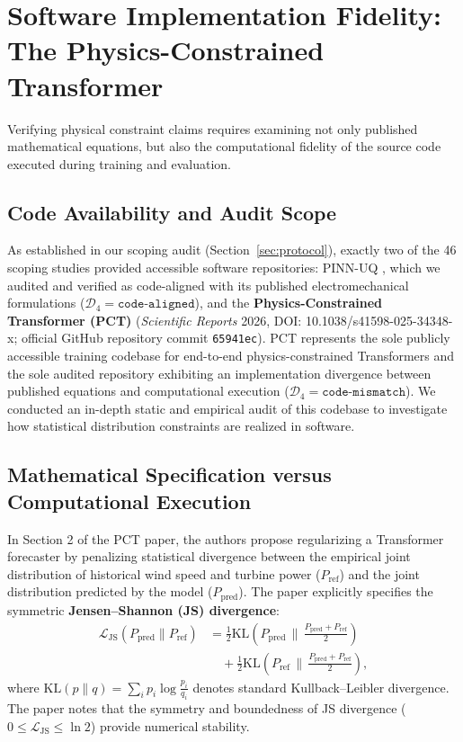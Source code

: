 \section{Software Implementation Fidelity: The Physics-Constrained Transformer}
\label{sec:code_audit}

Verifying physical constraint claims requires examining not only published mathematical equations, but also the computational fidelity of the source code executed during training and evaluation.

\subsection{Code Availability and Audit Scope}
As established in our scoping audit (Section~\ref{sec:protocol}), exactly two of the 46 scoping studies provided accessible software repositories: PINN-UQ \cite{s10_pinnuq2025}, which we audited and verified as code-aligned with its published electromechanical formulations ($\mathcal{D}_4 = \texttt{code-aligned}$), and the \textbf{Physics-Constrained Transformer (PCT)} \cite{pct2026} (\textit{Scientific Reports} 2026, DOI: 10.1038/s41598-025-34348-x; official GitHub repository commit \texttt{65941ec}). PCT represents the sole publicly accessible training codebase for end-to-end physics-constrained Transformers and the sole audited repository exhibiting an implementation divergence between published equations and computational execution ($\mathcal{D}_4 = \texttt{code-mismatch}$). We conducted an in-depth static and empirical audit of this codebase to investigate how statistical distribution constraints are realized in software.

\subsection{Mathematical Specification versus Computational Execution}
In Section 2 of the PCT paper, the authors propose regularizing a Transformer forecaster by penalizing statistical divergence between the empirical joint distribution of historical wind speed and turbine power ($P_{\text{ref}}$) and the joint distribution predicted by the model ($P_{\text{pred}}$). The paper explicitly specifies the symmetric \textbf{Jensen--Shannon (JS) divergence}:
\begin{equation}
\begin{aligned}
\mathcal{L}_{\text{JS}}(P_{\text{pred}} \parallel P_{\text{ref}}) &= \frac{1}{2} \text{KL}\left(P_{\text{pred}} \,\Big\|\, \frac{P_{\text{pred}} + P_{\text{ref}}}{2}\right) \\
&\quad + \frac{1}{2} \text{KL}\left(P_{\text{ref}} \,\Big\|\, \frac{P_{\text{pred}} + P_{\text{ref}}}{2}\right),
\end{aligned}
\label{eq:js_divergence}
\end{equation}
where $\text{KL}(p \parallel q) = \sum_i p_i \log \frac{p_i}{q_i}$ denotes standard Kullback--Leibler divergence. The paper notes that the symmetry and boundedness of JS divergence ($0 \le \mathcal{L}_{\text{JS}} \le \ln 2$) provide numerical stability.

